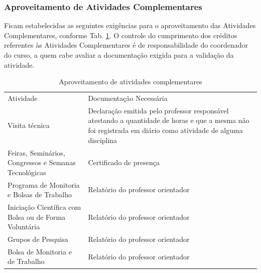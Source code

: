 \documentclass{paper}
\begin{document}
\subsubsection{Aproveitamento de Atividades Complementares}

Ficam estabelecidas as seguintes exigências para o aproveitamento das Atividades Complementares, conforme Tab. \ref{tab13}. O controle do cumprimento dos créditos referentes às Atividades Complementares é de responsabilidade do coordenador do curso, a quem cabe avaliar a documentação exigida para a validação da atividade.

\begin{longtable}{|p{8.5cm}|p{5.5cm}|}

\caption{Aproveitamento de atividades complementares}\label{tab13}

\vspace{-0.25cm}


\\ \hline 

 \cellcolor{\cinza}Atividade & \cellcolor{\cinza}Documentação Necessária \\ 
 
 \hline

 Visita técnica & Declaração emitida pelo professor responsável atestando a quantidade de horas e que a mesma não foi registrada em diário como atividade de alguma disciplina \\ 

 \hline 
 
 Feiras, Seminários, Congressos e Semanas Tecnológicas & Certificado de presença \\
 
 \hline
 
 Programa de Monitoria e Bolsas de Trabalho & Relatório do professor orientador \\
 
 \hline
 
 Iniciação Científica com Bolsa ou de Forma Voluntária & Relatório do professor orientador \\
 
 \hline
 
 Grupos de Pesquisa & Relatório do professor orientador \\
 
 \hline
 
 Bolsa de Monitoria e de Trabalho & Relatório do professor orientador \\
 

\end{longtable}
\end{document}
